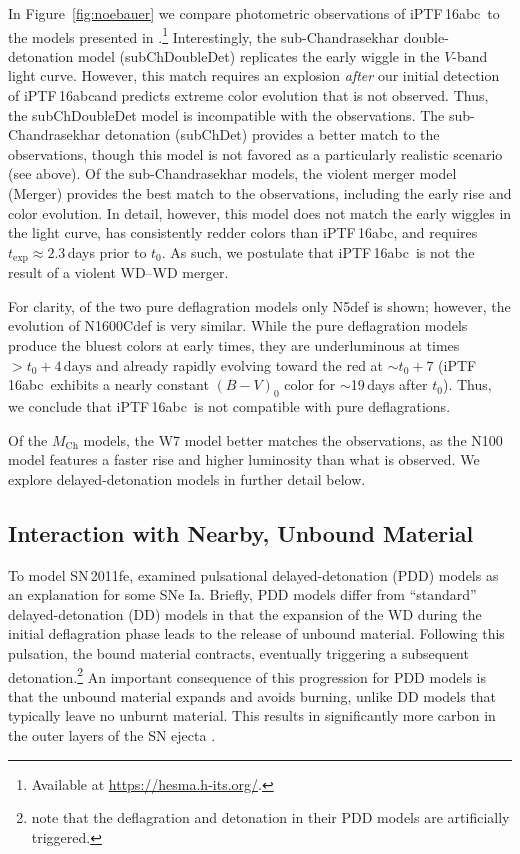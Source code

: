 \documentclass[twocolumn]{aastex61}
\newcommand{\abc}{iPTF\,16abc}
\begin{document}
In Figure~\ref{fig:noebauer} we compare photometric observations of \abc\ to
the models presented in \citet{2017MNRAS.472.2787N}.\footnote{Available at
\url{https://hesma.h-its.org/}.} Interestingly, the sub-Chandrasekhar
double-detonation model (subChDoubleDet) replicates the early wiggle in the
$V$-band light curve. However, this match requires an explosion
\textit{after} our initial detection of \abc and predicts extreme color
evolution that is not observed. Thus, the subChDoubleDet model is
incompatible with the observations. The sub-Chandrasekhar detonation
(subChDet) provides a better match to the observations, though this model is
not favored as a particularly realistic scenario (see above). Of the
sub-Chandrasekhar models, the violent merger model (Merger) provides the
best match to the observations, including the early rise and color
evolution. In detail, however, this model does not match the early wiggles
in the light curve, has consistently redder colors than \abc, and requires
$t_\mathrm{exp} \approx 2.3$\,days prior to $t_0$. As such, we postulate
that \abc\ is not the result of a violent WD--WD merger.

For clarity, of the two pure deflagration models only N5def is shown;
however, the evolution of N1600Cdef is very similar. While the pure
deflagration models produce the bluest colors at early times, they are
underluminous at times $>t_0 + 4\,\mathrm{days}$ and already rapidly
evolving toward the red at $\sim$$t_0 + 7$ (\abc\ exhibits a nearly constant
$(B-V)_0$ color for $\sim$19\,days after $t_0$). Thus, we conclude that
\abc\ is not compatible with pure deflagrations.

Of the $M_\mathrm{Ch}$ models, the W7 model better matches the
observations, as the N100 model features a faster rise and higher luminosity
than what is observed. We explore delayed-detonation models in further detail
below.

\subsection{Interaction with Nearby, Unbound Material}

To model SN\,2011fe, \citet{2014MNRAS.441..532D} examined pulsational
delayed-detonation (PDD) models as an explanation for some SNe Ia. Briefly,
PDD models differ from ``standard'' delayed-detonation (DD) models in that
the expansion of the WD during the initial deflagration phase leads to the
release of unbound material. Following this pulsation, the bound material
contracts, eventually triggering a subsequent
detonation.\footnote{\citet{2014MNRAS.441..532D} note that the deflagration
and detonation in their PDD models are artificially triggered.} An important
consequence of this progression for PDD models is that the unbound material
expands and avoids burning, unlike DD models that typically leave no unburnt
material. This results in significantly more carbon in the outer layers of
the SN ejecta \citep{2014MNRAS.441..532D}.
\end{document}
